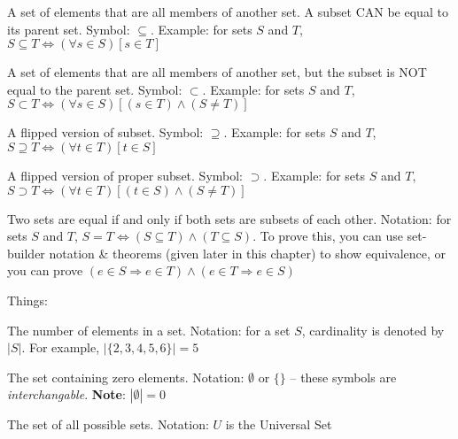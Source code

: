 \documentclass[main.tex]{subfiles}
\begin{document}
\begin{defn}[Subset]
	A set of elements that are all members of another set. A subset CAN be equal to its parent set. Symbol: \(\subseteq\). Example: for sets \(S\) and \(T\), \(S \subseteq T \Leftrightarrow (\forall s \in S)[s \in T]\)
\end{defn}

\begin{defn}
	A set of elements that are all members of another set, but the subset is NOT equal to the parent set. Symbol: \(\subset\). Example: for sets \(S\) and \(T\), \(S \subset T \Leftrightarrow (\forall s \in S)[(s \in T) \land (S \neq T)]\)
\end{defn}

\begin{defn}[Superset]
	A flipped version of subset. Symbol: \(\supseteq\). Example: for sets \(S\) and \(T\), \(S \supseteq T \Leftrightarrow (\forall t \in T)[t \in S]\)
\end{defn}

\begin{defn}
	A flipped version of proper subset. Symbol: \(\supset\). Example: for sets \(S\) and \(T\), \(S \supset T \Leftrightarrow (\forall t \in T)[(t \in S) \land (S \neq T)]\)
\end{defn}

\begin{defn}[Equality]
	Two sets are equal if and only if both sets are subsets of each other. Notation: for sets \(S\) and \(T\), \(S = T \Leftrightarrow (S \subseteq T) \land (T \subseteq S)\). To prove this, you can use set-builder notation \& theorems (given later in this chapter) to show equivalence, or you can prove \((e \in S \Rightarrow e \in T) \land (e \in T \Rightarrow e \in S)\)
\end{defn}

Things:

\begin{defn}[Cardinality]
	The number of elements in a set. Notation: for a set \(S\), cardinality is denoted by \(|S|\). For example, $|\{2,3,4,5,6\}| = 5$
\end{defn}

\begin{defn}
	The set containing zero elements. Notation: $\emptyset$ or $\{\}$ -- these symbols are \textit{interchangable}. \textbf{Note}: \(|\emptyset| = 0\)
\end{defn}

\begin{defn}
	The set of all possible sets. Notation: \(U\) is the Universal Set
\end{defn}
\end{document}
